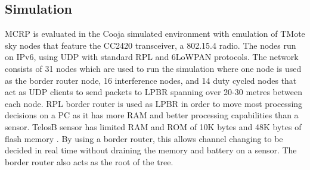 

\subsection{Simulation}
MCRP is evaluated in the Cooja simulated environment with emulation of TMote sky nodes that feature the CC2420 transceiver, a 802.15.4 radio. The nodes run on IPv6, using UDP with standard RPL and 6LoWPAN protocols. The network consists of 31 nodes which are used to run the simulation where one node is used as the border router node, 16 interference nodes, and 14 duty cycled nodes that act as UDP clients to send packets to LPBR spanning over 20-30 metres between each node. RPL border router is used as LPBR in order to move most processing decisions on a PC as it has more RAM and better processing capabilities than a sensor. TelosB sensor has limited RAM and ROM of 10K bytes and 48K bytes of flash memory \cite{telosb-datasheet}. By using a border router, this allows channel changing to be decided in real time without draining the memory and battery on a sensor. The border router also acts as the root of the tree.
